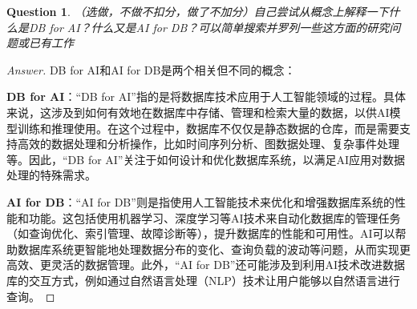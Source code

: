 \documentclass[UTF8,a4paper,10pt]{article}
\newtheorem{question}{Question}
\newenvironment{solution}
  {\begin{proof}[Answer]}
  {\end{proof}}
\begin{document}
	\begin{question}
	（选做，不做不扣分，做了不加分）自己尝试从概念上解释一下什么是DB for AI？什么又是AI for DB？可以简单搜索并罗列一些这方面的研究问题或已有工作
	\end{question}

	\begin{solution}
	DB for AI和AI for DB是两个相关但不同的概念：

	\textbf{DB for AI}：“DB for AI”指的是将数据库技术应用于人工智能领域的过程。具体来说，这涉及到如何有效地在数据库中存储、管理和检索大量的数据，以供AI模型训练和推理使用。在这个过程中，数据库不仅仅是静态数据的仓库，而是需要支持高效的数据处理和分析操作，比如时间序列分析、图数据处理、复杂事件处理等。因此，“DB for AI”关注于如何设计和优化数据库系统，以满足AI应用对数据处理的特殊需求。

	\textbf{AI for DB}：“AI for DB”则是指使用人工智能技术来优化和增强数据库系统的性能和功能。这包括使用机器学习、深度学习等AI技术来自动化数据库的管理任务（如查询优化、索引管理、故障诊断等），提升数据库的性能和可用性。AI可以帮助数据库系统更智能地处理数据分布的变化、查询负载的波动等问题，从而实现更高效、更灵活的数据管理。此外，“AI for DB”还可能涉及到利用AI技术改进数据库的交互方式，例如通过自然语言处理（NLP）技术让用户能够以自然语言进行查询。

	\end{solution}
\end{document}
